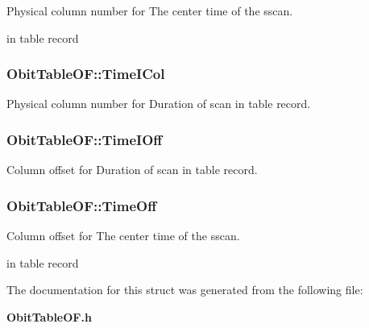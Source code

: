 Physical column number for The center time of the sscan. 

in table record 
\subsubsection{ {\bf Obit\-Table\-OF::Time\-ICol}}\label{structObitTableOF_o21}


Physical column number for Duration of scan in table record. 

\subsubsection{ {\bf Obit\-Table\-OF::Time\-IOff}}\label{structObitTableOF_o20}


Column offset for Duration of scan in table record. 

\subsubsection{ {\bf Obit\-Table\-OF::Time\-Off}}\label{structObitTableOF_o18}


Column offset for The center time of the sscan. 

in table record 

The documentation for this struct was generated from the following file:\begin{CompactItemize}
\item 
{\bf Obit\-Table\-OF.h}\end{CompactItemize}
